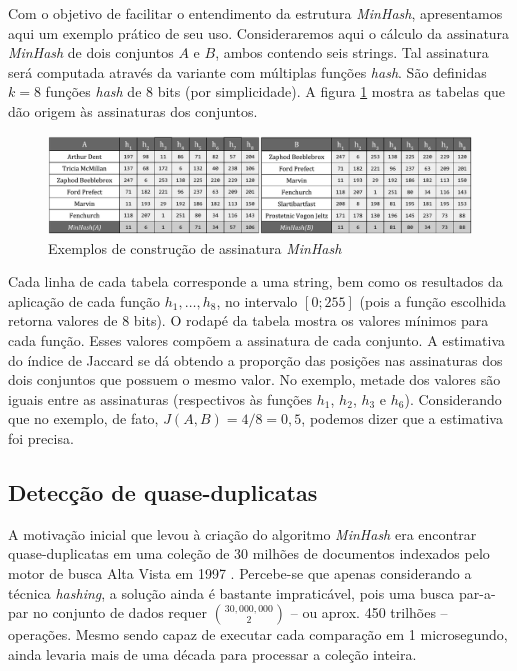 Com o objetivo de facilitar o entendimento da estrutura \emph{MinHash}, apresentamos aqui um exemplo prático de seu uso. Consideraremos aqui o cálculo da assinatura \emph{MinHash} de dois conjuntos $A$ e $B$, ambos contendo seis strings. Tal assinatura será computada através da variante com múltiplas funções \emph{hash}. São definidas $k=8$ funções \emph{hash} de 8 bits (por simplicidade). A figura \ref{fig:minhash_example} mostra as tabelas que dão origem às assinaturas dos conjuntos.

\begin{figure}[!htbp]
  \centering
  \includegraphics[scale=0.6]{figures/minhash_example.pdf}
  \caption{Exemplos de construção de assinatura \emph{MinHash}}
  \label{fig:minhash_example}
\end{figure}

Cada linha de cada tabela corresponde a uma string, bem como os resultados da aplicação de cada função $h_1, \ldots, h_8$, no intervalo $[0; 255]$ (pois a função escolhida retorna valores de 8 bits). O rodapé da tabela mostra os valores mínimos para cada função. Esses valores compõem a assinatura de cada conjunto. A estimativa do índice de Jaccard se dá obtendo a proporção das posições nas assinaturas dos dois conjuntos que possuem o mesmo valor. No exemplo, metade dos valores são iguais entre as assinaturas (respectivos às funções $h_1$, $h_2$, $h_3$ e $h_6$). Considerando que no exemplo, de fato, $J(A, B) = 4/8 = 0,5$, podemos dizer que a estimativa foi precisa.

\subsection{Detecção de quase-duplicatas}\label{sec:min:duplicate}

A motivação inicial que levou à criação do algoritmo \emph{MinHash} era encontrar quase-duplicatas em uma coleção de 30 milhões de documentos indexados pelo motor de busca Alta Vista em 1997 \cite{broder1997resemblance}. Percebe-se que apenas considerando a técnica \emph{hashing}, a solução ainda é bastante impraticável, pois uma busca par-a-par no conjunto de dados requer $\binom{30,000,000}{2}$ -- ou aprox. 450 trilhões -- operações. Mesmo sendo capaz de executar cada comparação em 1 microsegundo, ainda levaria mais de uma década para processar a coleção inteira.


